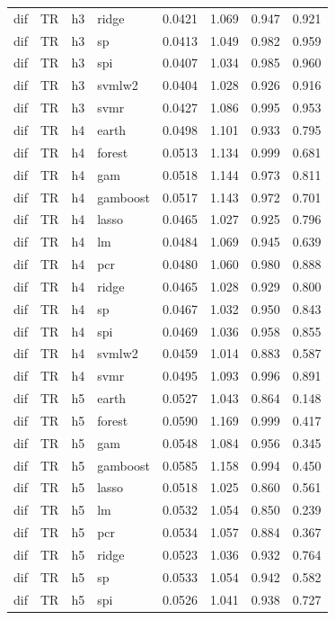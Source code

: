 \begin{ThreePartTable}
\begin{longtable}[t]{llclcccc}
dif & TR & h3 & ridge & 0.0421 & 1.069 & 0.947 & 0.921\\
dif & TR & h3 & sp & 0.0413 & 1.049 & 0.982 & 0.959\\
dif & TR & h3 & spi & 0.0407 & 1.034 & 0.985 & 0.960\\
dif & TR & h3 & svmlw2 & 0.0404 & 1.028 & 0.926 & 0.916\\
dif & TR & h3 & svmr & 0.0427 & 1.086 & 0.995 & 0.953\\
\addlinespace
dif & TR & h4 & earth & 0.0498 & 1.101 & 0.933 & 0.795\\
dif & TR & h4 & forest & 0.0513 & 1.134 & 0.999 & 0.681\\
dif & TR & h4 & gam & 0.0518 & 1.144 & 0.973 & 0.811\\
dif & TR & h4 & gamboost & 0.0517 & 1.143 & 0.972 & 0.701\\
dif & TR & h4 & lasso & 0.0465 & 1.027 & 0.925 & 0.796\\
dif & TR & h4 & lm & 0.0484 & 1.069 & 0.945 & 0.639\\
dif & TR & h4 & pcr & 0.0480 & 1.060 & 0.980 & 0.888\\
dif & TR & h4 & ridge & 0.0465 & 1.028 & 0.929 & 0.800\\
dif & TR & h4 & sp & 0.0467 & 1.032 & 0.950 & 0.843\\
dif & TR & h4 & spi & 0.0469 & 1.036 & 0.958 & 0.855\\
dif & TR & h4 & svmlw2 & 0.0459 & 1.014 & 0.883 & 0.587\\
dif & TR & h4 & svmr & 0.0495 & 1.093 & 0.996 & 0.891\\
\addlinespace
dif & TR & h5 & earth & 0.0527 & 1.043 & 0.864 & 0.148\\
dif & TR & h5 & forest & 0.0590 & 1.169 & 0.999 & 0.417\\
dif & TR & h5 & gam & 0.0548 & 1.084 & 0.956 & 0.345\\
dif & TR & h5 & gamboost & 0.0585 & 1.158 & 0.994 & 0.450\\
dif & TR & h5 & lasso & 0.0518 & 1.025 & 0.860 & 0.561\\
dif & TR & h5 & lm & 0.0532 & 1.054 & 0.850 & 0.239\\
dif & TR & h5 & pcr & 0.0534 & 1.057 & 0.884 & 0.367\\
dif & TR & h5 & ridge & 0.0523 & 1.036 & 0.932 & 0.764\\
dif & TR & h5 & sp & 0.0533 & 1.054 & 0.942 & 0.582\\
dif & TR & h5 & spi & 0.0526 & 1.041 & 0.938 & 0.727\\

\end{longtable}
\end{ThreePartTable}
